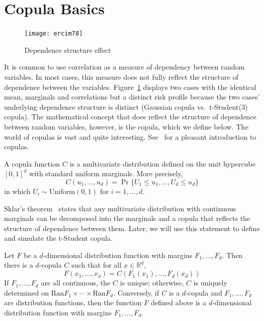 \documentclass[11pt,fleqn]{book} %
\begin{document}
\section{Copula Basics}
\label{ap:copula_basics}

\begin{figure}
	\vspace{-25pt}
	\begin{center}
		\texttt{[image: ercim78]}
	\end{center}
	\vspace{-10pt}
	\caption{Dependence structure effect}
	\vspace{-10pt}
	\label{fig:copula_effect}
\end{figure}
It is common to use correlation as a measure of dependency between random 
variables. In most cases, this measure does not fully reflect the structure 
of dependence between the variables. Figure~\ref{fig:copula_effect} displays 
two cases with the identical mean, marginals and correlations but a distinct 
risk profile because the two cases' underlying  dependence structure is 
distinct (Gaussian copula vs.\ t-Student(3) copula). The mathematical concept 
that does reflect the structure of dependence between random variables, 
however, is the copula, which we define below. The world of copulas is vast 
and quite interesting. See~\cite[chap. 5]{mcneil:2005} for a pleasant 
introduction to copulas.

\begin{definition}[Copula]
	A copula function $C$ is a multivariate distribution defined on the 
	unit hypercube $[0,1]^d$ with standard uniform marginals. 
	More precisely,
	\begin{displaymath}
		C(u_1, \dots, u_d) = \Pr\{U_1 \le u_1, \dots, U_d \le u_d\}
	\end{displaymath}
	in which $U_i \sim \text{Uniform}(0,1) \text{ for } i = 1,\dots, d$.
\end{definition}

Sklar's theorem~\cite{sklar:1959} states that any multivariate 
distribution with continuous marginals can be decomposed into the marginals and 
a copula that reflects the structure of dependence between them. Later, we will 
use this statement to define and simulate the t-Student copula.

\begin{theorem}
	\label{thm:sklar}
	Let $F$ be a $d$-dimensional distribution function with margins 
	$F_1,\dots,F_d$. Then there is a $d$-copula $C$ such that for all 
	$x \in \mathbb{R}^d$,
	\begin{displaymath}
		F(x_1,\dots,x_d) = C(F_1(x_1),\dots,F_d(x_d))
	\end{displaymath}
	If $F_1,\dots,F_d$ are all continuous, the $C$ is unique; otherwise, $C$ is 
	uniquely determined on $\text{Ran}F_1 \times \cdots \times \text{Ran}F_d$.
	Conversely, if $C$ is a $d$-copula and $F_1,\dots,F_d$ are distribution 
	functions, then the function $F$ defined above is a $d$-dimensional 
	distribution function with margins $F_1,\dots,F_d$.
\end{theorem}
\end{document}

